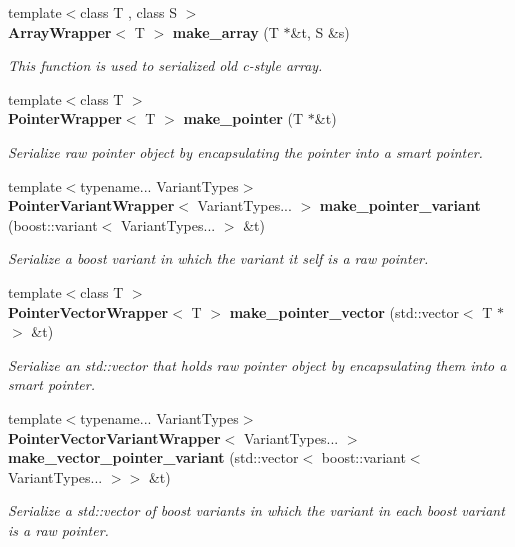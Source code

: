 \begin{DoxyCompactItemize}
\item 
{\footnotesize template$<$class T , class S $>$ }\\\textbf{ Array\+Wrapper}$<$ T $>$ \textbf{ make\+\_\+array} (T $\ast$\&t, S \&s)
\begin{DoxyCompactList}\small\item\em This function is used to serialized old c-\/style array. \end{DoxyCompactList}\item 
{\footnotesize template$<$class T $>$ }\\\textbf{ Pointer\+Wrapper}$<$ T $>$ \textbf{ make\+\_\+pointer} (T $\ast$\&t)
\begin{DoxyCompactList}\small\item\em Serialize raw pointer object by encapsulating the pointer into a smart pointer. \end{DoxyCompactList}\item 
{\footnotesize template$<$typename... Variant\+Types$>$ }\\\textbf{ Pointer\+Variant\+Wrapper}$<$ Variant\+Types... $>$ \textbf{ make\+\_\+pointer\+\_\+variant} (boost\+::variant$<$ Variant\+Types... $>$ \&t)
\begin{DoxyCompactList}\small\item\em Serialize a boost variant in which the variant it self is a raw pointer. \end{DoxyCompactList}\item 
{\footnotesize template$<$class T $>$ }\\\textbf{ Pointer\+Vector\+Wrapper}$<$ T $>$ \textbf{ make\+\_\+pointer\+\_\+vector} (std\+::vector$<$ T $\ast$$>$ \&t)
\begin{DoxyCompactList}\small\item\em Serialize an std\+::vector that holds raw pointer object by encapsulating them into a smart pointer. \end{DoxyCompactList}\item 
{\footnotesize template$<$typename... Variant\+Types$>$ }\\\textbf{ Pointer\+Vector\+Variant\+Wrapper}$<$ Variant\+Types... $>$ \textbf{ make\+\_\+vector\+\_\+pointer\+\_\+variant} (std\+::vector$<$ boost\+::variant$<$ Variant\+Types... $>$$>$ \&t)
\begin{DoxyCompactList}\small\item\em Serialize a std\+::vector of boost variants in which the variant in each boost variant is a raw pointer. \end{DoxyCompactList}\end{DoxyCompactItemize}


